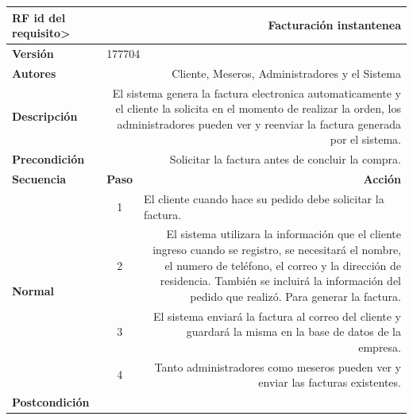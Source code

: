 \documentclass[conference]{IEEEtran}
\begin{document}
\begin{table}[H]
  \centering
  \begin{adjustbox}{width=0.44\textwidth}
    \begin{tabular}{|p{11.215em}|r|r|}
    \toprule
    \textbf{RF id del requisito>} & \multicolumn{2}{p{37.355em}|}{\textbf{Facturación instantenea}} \\
    \midrule
    \textbf{Versión} & \multicolumn{2}{l|}{177704} \\
    \midrule
    \textbf{Autores} & \multicolumn{2}{p{37.355em}|}{Cliente, Meseros, Administradores y el Sistema} \\
    \midrule
    \textbf{Descripción} & \multicolumn{2}{p{37.355em}|}{El sistema genera la factura electronica automaticamente y el cliente la solicita en el momento de realizar la orden, los administradores pueden ver y reenviar la factura generada por el sistema.} \\
    \midrule
    \textbf{Precondición} & \multicolumn{2}{p{37.355em}|}{Solicitar la factura antes de concluir la compra.} \\
    \midrule
    \textbf{Secuencia} & \multicolumn{1}{p{5.355em}|}{\textbf{Paso}} & \multicolumn{1}{p{32em}|}{\textbf{Acción}} \\
    \midrule
    \multirow{5}[8]{*}{\textbf{Normal}} & \multicolumn{1}{c|}{\multirow{2}[2]{*}{1}} & \multicolumn{1}{l|}{\multirow{2}[2]{*}{El cliente cuando hace su pedido debe solicitar la factura.}} \\
    \multicolumn{1}{|c|}{} & \multicolumn{1}{c|}{} &  \\
\cmidrule{2-3}    \multicolumn{1}{|c|}{} & \multicolumn{1}{c|}{2} & \multicolumn{1}{p{32em}|}{El sistema utilizara la información que el cliente ingreso cuando se registro, se necesitará el nombre, el numero de teléfono, el correo y la dirección de residencia. También se incluirá la información del pedido que realizó. Para generar la factura.} \\
\cmidrule{2-3}    \multicolumn{1}{|c|}{} & \multicolumn{1}{c|}{3} & \multicolumn{1}{p{32em}|}{El sistema enviará la factura al correo del cliente y guardará la misma en la base de datos de la empresa.} \\
\cmidrule{2-3}    \multicolumn{1}{|c|}{} & \multicolumn{1}{c|}{4} & \multicolumn{1}{p{32em}|}{Tanto administradores como meseros pueden ver y enviar las facturas existentes.} \\
    \midrule
    \textbf{Postcondición} & \multicolumn{2}{r|}{} \\

\end{tabular}
\end{adjustbox}
\end{table}
\end{document}
